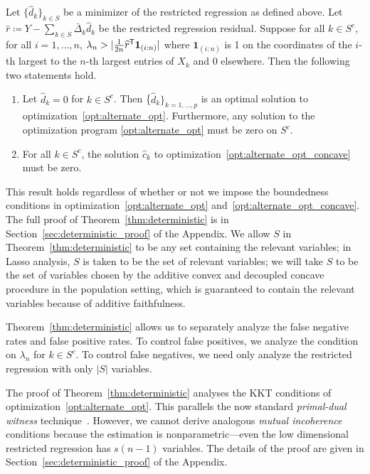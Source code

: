 \begin{theorem}
\label{thm:deterministic}
Let $\{\hat{d}_k \}_{k \in S}$ be a minimizer of the restricted regression as defined above.
Let $\hat{r} \coloneqq Y - \sum_{k \in S} \bar{\Delta}_k \hat{d}_k$ be the restricted regression residual. 
Suppose for all $k\in S^c$, for all $i=1,\ldots,n$, $\lambda_n > | \frac{1}{2n}
\widehat{r}^{\mathsf{T}} \mbox{\boldmath $1$}_{(i:n)}|$ where $\mathbf{1}_{(i:n)}$ is 1 on
the coordinates of the 
$i$-th largest to the $n$-th largest entries of $X_k$ and 0
elsewhere.  Then the following two statements hold.
\begin{enumerate}
\item Let $\hat{d}_k = 0$ for $k \in S^c$.  Then
  \{$\hat{d}_k\}_{k=1,\ldots,p}$ is an optimal solution to
  optimization~\eqref{opt:alternate_opt}. Furthermore, any solution to
  the optimization program \eqref{opt:alternate_opt} must be zero on
  $S^c$.
\item For all $k \in S^c$, the solution $\hat{c}_k$ to optimization~\eqref{opt:alternate_opt_concave} must be zero.
\end{enumerate}

\end{theorem}

This result holds regardless of whether or not we impose the boundedness conditions in optimization~\eqref{opt:alternate_opt} and~\eqref{opt:alternate_opt_concave}.
The full proof of Theorem~\ref{thm:deterministic} is in Section~\ref{sec:deterministic_proof} of the Appendix. We allow $S$ in Theorem~\ref{thm:deterministic} to be any set containing the relevant variables; in Lasso analysis, $S$ is taken to be the set of relevant variables; we will take $S$ to be the set of variables chosen by the additive convex and decoupled concave procedure in the population setting, which is guaranteed to contain the relevant variables because of additive faithfulness.

Theorem~\ref{thm:deterministic} allows us to separately analyze the false negative
rates and false positive rates. To control false positives,
we analyze the condition on $\lambda_n$ for $k \in S^c$. To control
false negatives, we need only analyze the restricted regression with only $|S|$ variables.

The proof of Theorem~\ref{thm:deterministic} analyses the KKT
conditions of optimization~\eqref{opt:alternate_opt}.  This parallels
the now standard \emph{primal-dual witness}
technique~\citep{wainwright2009sharp}. However, we cannot derive analogous
\emph{mutual incoherence} conditions because the estimation is
nonparametric---even the low dimensional restricted regression has
$s(n-1)$ variables. The details of the proof are given in
Section~\ref{sec:deterministic_proof} of the Appendix.

